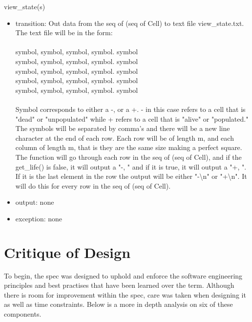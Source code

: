 \documentclass[12pt]{article}
\begin{document}
view\_state(s)
\begin{itemize}
    \item transition: Out data from the seq of (seq of Cell) to text file view\_state.txt. The text file will be in the form:\\
    \\
    symbol, symbol, symbol, symbol. symbol\\
    symbol, symbol, symbol, symbol. symbol\\
    symbol, symbol, symbol, symbol. symbol\\
    symbol, symbol, symbol, symbol. symbol\\
    symbol, symbol, symbol, symbol. symbol\\
    \\
    Symbol corresponds to either a -, or a +. - in this case refers to a cell that is "dead" or "unpopulated" while + refers to a cell that is "alive" or "populated." The symbols will be separated by comma's and there will be a new line character at the end of each row. Each row will be of length m, and each column of length m, that is they are the same size making a perfect square.\\
    
    The function will go through each row in the seq of (seq of Cell), and if the get\_life() is false, it will output a "-, " and if it is true, it will output a "+, ". If it is the last element in the row the output will be either "-\textbackslash n" or "+\textbackslash n". It will do this for every row in the seq of (seq of Cell).
    
    \item output: none
    \item exception: none
\end{itemize}

\newpage

\section*{Critique of Design}

To begin, the spec was designed to uphold and enforce the software engineering principles and best practises that have been learned over the term. Although there is room for improvement within the spec, care was taken when designing it as well as time constraints. Below is a more in depth analysis on six of these components.\\
\end{document}
